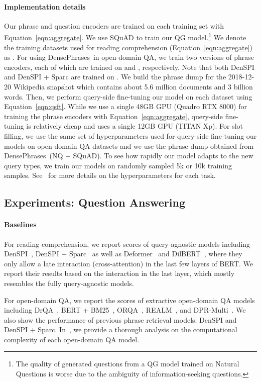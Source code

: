 \documentclass[11pt,a4paper]{article}
\newcommand{\ours}{DensePhrases}
\begin{document}
\paragraph{Implementation details}
Our phrase and question encoders are trained on each training set with Equation~\eqref{eqn:aggregate}.
We use SQuAD to train our QG model.\footnote{The quality of generated questions from a QG model trained on Natural Questions is worse due to the ambiguity of information-seeking questions.}
We denote the training datasets used for reading comprehension (Equation~\eqref{eqn:aggregate}) as .
For using \ours~in open-domain QA, we train two versions of phrase encoders, each of which are trained on  and , respectively.
Note that both DenSPI and DenSPI + Sparc are trained on .
We build the phrase dump  for the 2018-12-20 Wikipedia snapshot which contains about 5.6 million documents and 3 billion words.
Then, we perform query-side fine-tuning our model on each dataset using Equation~\eqref{eqn:qsft}.
While we use a single 48GB GPU (Quadro RTX 8000) for training the phrase encoders with Equation~\eqref{eqn:aggregate}, query-side fine-tuning is relatively cheap and uses a single 12GB GPU (TITAN Xp).
For slot filling, we use the same set of hyperparameters used for query-side fine-tuning our models on open-domain QA datasets and we use the phrase dump obtained from \ours~(NQ + SQuAD).
To see how rapidly our model adapts to the new query types, we train our models on randomly sampled 5k or 10k training samples.
See~ for more details on the hyperparameters for each task.

\subsection{Experiments: Question Answering}\label{sec:openqa_result}
\paragraph{Baselines}
For reading comprehension, we report scores of query-agnostic models including DenSPI~\citep{seo2019real}, DenSPI + Sparc~\citep{lee2020contextualized} as well as Deformer~\citep{cao2020deformer} and DilBERT~\citep{siblini2020delaying}, where they only allow a late interaction (cross-attention) in the last few layers of BERT.
We report their results based on the interaction in the last layer, which mostly resembles the fully query-agnostic models.

For open-domain QA, we report the scores of extractive open-domain QA models including DrQA~\citep{chen2017reading}, BERT + BM25~\citep{lee2019latent}, ORQA~\citep{lee2019latent}, REALM~\citep{guu2020realm}, and DPR-Multi~\citep{karpukhin2020dense}.
We also show the performance of previous phrase retrieval models: DenSPI and DenSPI + Sparc.
In~, we provide a thorough analysis on the computational complexity of each open-domain QA model.
\end{document}
